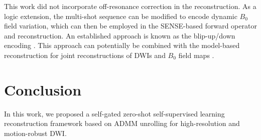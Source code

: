 \documentclass[journal,twoside,web]{ieeecolor}
\begin{document}
	This work did not incorporate off-resonance correction in the reconstruction.
	As a logic extension, the multi-shot sequence can be modified
	to encode dynamic $B_0$ field variation, which can then be employed in the SENSE-based forward operator and reconstruction. An established approach
	is known as the blip-up/down encoding \cite{zahneisen_2017_blipud}.
	This approach can potentially be combined with the model-based reconstruction
	for joint reconstructions of DWIs and $B_0$ field maps \cite{tan_2022_meco}.

	\section{Conclusion}

	In this work, we proposed a self-gated zero-shot self-supervised learning
	reconstruction framework based on ADMM unrolling
	for high-resolution and motion-robust DWI.




	
	
\end{document}
